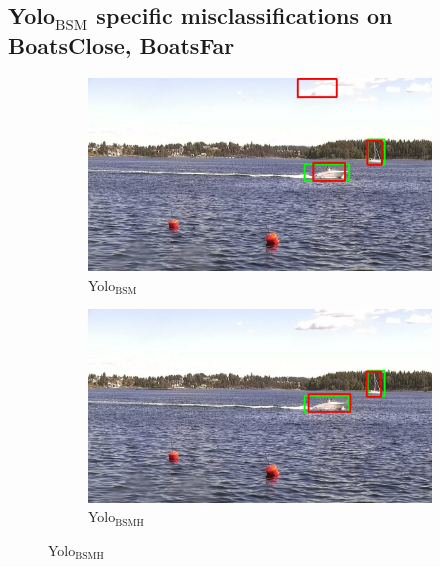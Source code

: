 \subsection{Yolo$_{\text{BSM}}$ specific misclassifications on BoatsClose, BoatsFar}
\label{sec:yolo2_spec_misc}
\begin{figure}[h!]
\begin{subfigure}{.5\textwidth}
  \centering
  \includegraphics[width=0.9\linewidth]{results/case_buildings/yolo23/grove/yolo2/selected_06_25_frame0357.jpg}
  \caption{Yolo$_{\text{BSM}}$}
\end{subfigure}%
\begin{subfigure}{.5\textwidth}
  \centering
  \includegraphics[width=.9\linewidth]{results/case_buildings/yolo23/grove/yolo3/selected_06_25_frame0357.jpg}
  \caption{Yolo$_{\text{BSMH}}$}
\end{subfigure}


\end{figure}
